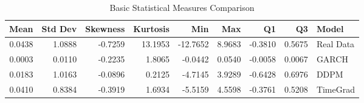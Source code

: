 \begin{table}
\caption{Basic Statistical Measures Comparison}
\label{tab:basic_stats}
\begin{tabular}{rrrrrrrrl}
\toprule
Mean & Std Dev & Skewness & Kurtosis & Min & Max & Q1 & Q3 & Model \\
\midrule
0.0438 & 1.0888 & -0.7259 & 13.1953 & -12.7652 & 8.9683 & -0.3810 & 0.5675 & Real Data \\
0.0003 & 0.0110 & -0.2235 & 1.8065 & -0.0442 & 0.0540 & -0.0058 & 0.0067 & GARCH \\
0.0183 & 1.0163 & -0.0896 & 0.2125 & -4.7145 & 3.9289 & -0.6428 & 0.6976 & DDPM \\
0.0410 & 0.8384 & -0.3919 & 1.6934 & -5.5159 & 4.5598 & -0.3761 & 0.5208 & TimeGrad \\
\bottomrule
\end{tabular}
\end{table}
